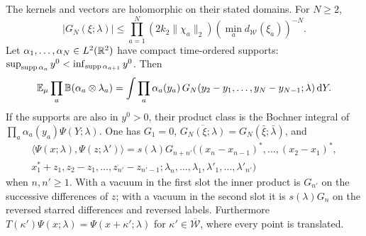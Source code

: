 \begin{proposition}\label{prop:rotation-ordered-kernels}
The kernels and vectors are holomorphic on their stated domains.
For $N\ge2$,
\begin{equation}\label{eq:rotation-ordered-kernel-bound}
 |G_N(\xi;\lambda)|
 \le\prod_{a=1}^N(2k_2\|\chi_a\|_2)
       \left(\min_a d_{\mathcal W}(\xi_a)\right)^{-N}.
\end{equation}
Let $\alpha_1,\ldots,\alpha_N\in L^2(\mathbb R^2)$ have compact
time-ordered supports:
$\sup_{\operatorname{supp}\alpha_a}y^0<\inf_{\operatorname{supp}\alpha_{a+1}}y^0$.
Then
\begin{equation}\label{eq:rotation-ordered-density}
 \mathbb E_\mu\prod_a\mathbb B(\alpha_a\otimes\lambda_a)
 =\int\prod_a\alpha_a(y_a)\,
       G_N(y_2-y_1,\ldots,y_N-y_{N-1};\lambda)\,\mathrm d Y.
\end{equation}
If the supports are also in $y^0>0$, their product class is
the Bochner integral of $\prod_a\alpha_a(y_a)\Psi(Y;\lambda)$.
One has $G_1=0$,
$\overline{G_N(\xi;\lambda)}=G_N(\bar\xi;\bar\lambda)$, and
\begin{multline}\label{eq:rotation-ordered-Gram}
 \langle\Psi(x;\lambda),\Psi(z;\lambda')\rangle
 =s(\lambda)G_{n+n'}((x_n-x_{n-1})^*,\ldots,(x_2-x_1)^*,\\
       x_1^*+z_1,z_2-z_1,\ldots,z_{n'}-z_{n'-1};
       \lambda_n,\ldots,\lambda_1,\lambda'_1,\ldots,\lambda'_{n'})
\end{multline}
when $n,n'\ge1$. With a vacuum in the first slot the inner
product is $G_{n'}$ on the successive differences of $z$;
with a vacuum in the second slot it is $s(\lambda)G_n$
on the reversed starred differences and reversed labels.
Furthermore
$T(\kappa')\Psi(x;\lambda)=\Psi(x+\kappa';\lambda)$ for
$\kappa'\in\overline{\mathcal W}$, where every point is translated.
\end{proposition}

